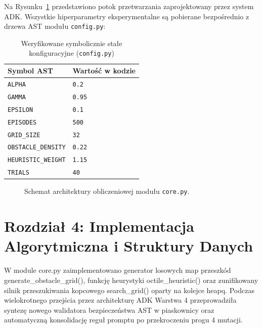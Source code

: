 \documentclass[11pt,a4paper]{article}
\begin{document}
Na Rysunku~\ref{fig:arch_tikz} przedstawiono potok przetwarzania zaprojektowany przez system ADK.
Wszystkie hiperparametry eksperymentalne są pobierane bezpośrednio z drzewa AST modułu \texttt{config.py}:

\begin{table}[htbp]
\centering
\caption{Weryfikowane symbolicznie stałe konfiguracyjne (\texttt{config.py})}
\begin{tabular}{ll}
\toprule
\textbf{Symbol AST} & \textbf{Wartość w kodzie} \\
\midrule
\texttt{ALPHA} & \texttt{0.2} \\
\texttt{GAMMA} & \texttt{0.95} \\
\texttt{EPSILON} & \texttt{0.1} \\
\texttt{EPISODES} & \texttt{500} \\
\texttt{GRID\_SIZE} & \texttt{32} \\
\texttt{OBSTACLE\_DENSITY} & \texttt{0.22} \\
\texttt{HEURISTIC\_WEIGHT} & \texttt{1.15} \\
\texttt{TRIALS} & \texttt{40} \\
\bottomrule
\end{tabular}
\end{table}

\begin{figure}[htbp]
\centering
{}
\caption{Schemat architektury obliczeniowej modułu \texttt{core.py}.}
\label{fig:arch_tikz}
\end{figure}

\section{Rozdział 4: Implementacja Algorytmiczna i Struktury Danych}
W module core.py zaimplementowano generator losowych map przeszkód generate_obstacle_grid(), funkcję heurystyki octile_heuristic() oraz zunifikowany silnik przeszukiwania kopcowego search_grid() oparty na kolejce heapq. Podczas wielokrotnego przejścia przez architekturę ADK Warstwa 4 przeprowadziła syntezę nowego walidatora bezpieczeństwa AST w piaskownicy oraz automatyczną konsolidację reguł promptu po przekroczeniu progu 4 mutacji.
\end{document}
